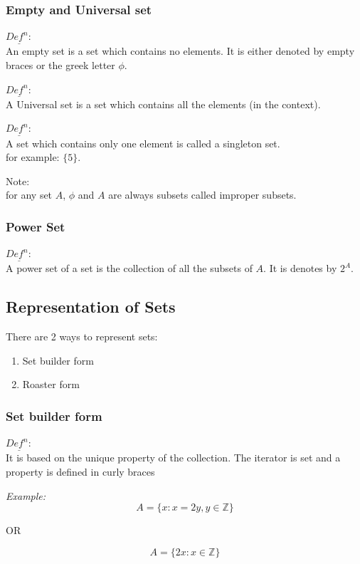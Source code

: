 \documentclass[11pt,letterpaper]{article}
\newenvironment{example}                             
        {\noindent\textit{Example:}\\}
	{}
\newenvironment{definition}
	{\begin{mdframed}$\underline{\textit{Def}^\textit{n}:} $\\}
	{\end{mdframed}}
\begin{document}
\subsubsection{Empty and Universal set}
\begin{definition}
  An empty set is a set which contains no elements. It is either denoted by empty braces or the greek letter $\phi$.
\end{definition}
\begin{definition}
  A Universal set is a set which contains all the elements (in the context). 
\end{definition}
\begin{definition}
  A set which contains only one element is called a singleton set. \\ 
  for example: $\{5\}$.
\end{definition}

Note: \\
for any set $A$, $\phi$ and $A$ are always subsets called improper subsets. 

\subsubsection{Power Set}
\begin{definition}
  A power set of a set is the collection of all the subsets of $A$. It is denotes by $2^A$.
\end{definition}

\subsection{Representation of Sets}
There are 2 ways to represent sets:
\begin{enumerate}
  \item Set builder form 
  \item Roaster form
\end{enumerate}

\subsubsection{Set builder form}
\begin{definition}
  It is based on the unique property of the collection. The iterator is set and a property is defined in curly braces
\end{definition}
\begin{example}
  \[
    A = \{x: x = 2y, y \in \mathbb{Z}\}
  \]
  \begin{center}
    OR
  \end{center}
  \[
    A = \{2x: x \in \mathbb{Z}\}
  \]
\end{example}
\end{document}
